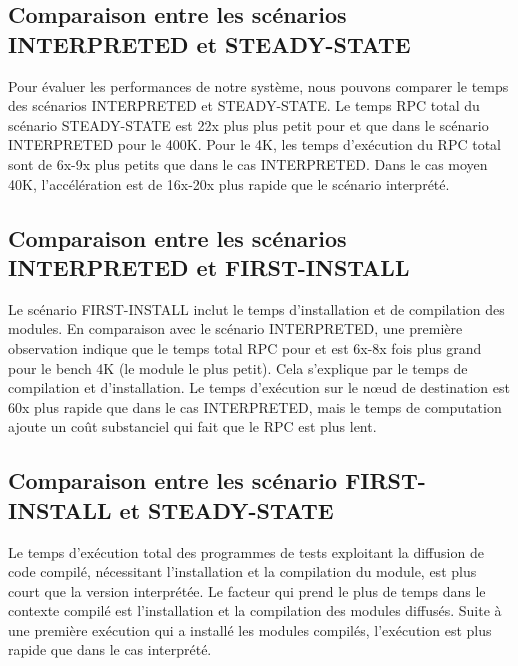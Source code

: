 \subsection{Comparaison entre les scénarios INTERPRETED et STEADY-STATE}

Pour évaluer les performances de notre système, nous pouvons comparer le temps
des scénarios INTERPRETED et STEADY-STATE. Le temps RPC total du scénario
STEADY-STATE est 22x plus plus petit pour \MMM[x86/macOS] et 
que dans le scénario INTERPRETED pour le 400K. Pour le 4K, les temps
d'exécution du RPC total sont de 6x-9x plus petits que dans le cas INTERPRETED.
Dans le cas moyen 40K, l'accélération est de 16x-20x plus rapide que le
scénario interprété.

\subsection{Comparaison entre les scénarios INTERPRETED et FIRST-INSTALL}

Le scénario FIRST-INSTALL inclut le temps d'installation et de compilation des
modules. En comparaison avec le scénario INTERPRETED, une première observation
indique que le temps total RPC pour \MMM[x86/macOS] et  est
6x-8x fois plus grand pour le bench 4K (le module le plus petit). Cela
s'explique par le temps de compilation et d'installation.  Le temps d'exécution
sur le nœud de destination est 60x plus rapide que dans le cas INTERPRETED,
mais le temps de computation ajoute un coût substanciel qui fait que le RPC
est plus lent.


\subsection{Comparaison entre les scénario FIRST-INSTALL et STEADY-STATE}
%
Le temps d'exécution total des programmes de tests exploitant la diffusion de
code compilé, nécessitant l'installation et la compilation du module, est plus
court que la version interprétée. Le facteur qui prend le plus de temps dans le
contexte compilé est l'installation et la compilation des modules diffusés.
Suite à une première exécution qui a installé les modules compilés, l'exécution
est plus rapide que dans le cas interprété.


